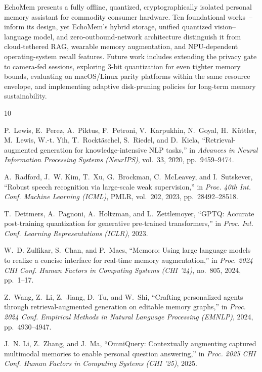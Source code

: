 \documentclass[conference]{IEEEtran}
\begin{document}
EchoMem presents a fully offline, quantized, cryptographically isolated personal
memory assistant for commodity consumer hardware. Ten foundational
works~\cite{lewis2020rag}--\cite{chen2023edgellm} inform its design, yet
EchoMem's hybrid storage, unified quantized vision--language model, and
zero-outbound-network architecture distinguish it from cloud-tethered RAG,
wearable memory augmentation, and NPU-dependent operating-system recall
features. Future work includes extending the privacy gate to camera-fed
sessions, exploring 3-bit quantization for even tighter memory bounds,
evaluating on macOS/Linux parity platforms within the same resource envelope,
and implementing adaptive disk-pruning policies for long-term memory
sustainability.

\begin{thebibliography}{10}

P.~Lewis, E.~Perez, A.~Piktus, F.~Petroni, V.~Karpukhin, N.~Goyal, H.~K\"uttler,
M.~Lewis, W.-t. Yih, T.~Rockt\"aschel, S.~Riedel, and D.~Kiela,
``Retrieval-augmented generation for knowledge-intensive NLP tasks,''
in \textit{Advances in Neural Information Processing Systems (NeurIPS)},
vol.~33, 2020, pp.~9459--9474.

A.~Radford, J.~W. Kim, T.~Xu, G.~Brockman, C.~McLeavey, and I.~Sutskever,
``Robust speech recognition via large-scale weak supervision,''
in \textit{Proc. 40th Int. Conf. Machine Learning (ICML)}, PMLR, vol.~202,
2023, pp.~28492--28518.

T.~Dettmers, A.~Pagnoni, A.~Holtzman, and L.~Zettlemoyer,
``GPTQ: Accurate post-training quantization for generative pre-trained
transformers,'' in \textit{Proc. Int. Conf. Learning Representations (ICLR)},
2023.

W.~D. Zulfikar, S.~Chan, and P.~Maes,
``Memoro: Using large language models to realize a concise interface for
real-time memory augmentation,'' in \textit{Proc. 2024 CHI Conf. Human Factors
in Computing Systems (CHI '24)}, no.~805, 2024, pp.~1--17.

Z.~Wang, Z.~Li, Z.~Jiang, D.~Tu, and W.~Shi,
``Crafting personalized agents through retrieval-augmented generation on
editable memory graphs,'' in \textit{Proc. 2024 Conf. Empirical Methods in
Natural Language Processing (EMNLP)}, 2024, pp.~4930--4947.

J.~N. Li, Z.~Zhang, and J.~Ma,
``OmniQuery: Contextually augmenting captured multimodal memories to enable
personal question answering,'' in \textit{Proc. 2025 CHI Conf. Human Factors in
Computing Systems (CHI '25)}, 2025.


\end{thebibliography}
\end{document}
